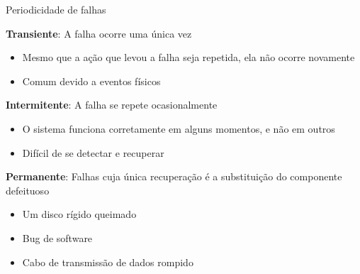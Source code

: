 \documentclass[compress]{beamer}
\begin{document}

\begin{frame}{Periodicidade de falhas}

\textbf{Transiente}: A falha ocorre uma única vez
\begin{itemize}
    \item Mesmo que a ação que levou a falha seja repetida, ela não ocorre novamente
    \item Comum devido a eventos físicos
\end{itemize}

\vspace{0.35cm}

\textbf{Intermitente}: A falha se repete ocasionalmente
\begin{itemize}
    \item O sistema funciona corretamente em alguns momentos, e não em outros
    \item Difícil de se detectar e recuperar
\end{itemize}

\vspace{0.35cm}

\textbf{Permanente}: Falhas cuja única recuperação é a substituição do componente defeituoso
\begin{itemize}
    \item Um disco rígido queimado
    \item Bug de software
    \item Cabo de transmissão de dados rompido
\end{itemize}

\end{frame}

\end{document}
